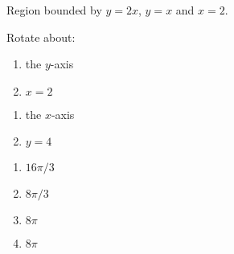 {Region bounded by $y=2x$, $y=x$ and $x=2$.

Rotate about:

\noindent%
\begin{minipage}[t]{.5\linewidth}
\begin{enumerate}
\item		the $y$-axis
\item		$x=2$
\end{enumerate}
\end{minipage}
\begin{minipage}[t]{.5\linewidth}
\begin{enumerate}\addtocounter{enumii}{2}
\item		the $x$-axis
\item		$y=4$
\end{enumerate}
\end{minipage}
}
{\begin{enumerate}
\item $16\pi/3$
\item $8\pi/3$
\item $8\pi$
\item $8\pi$
\end{enumerate}
}

